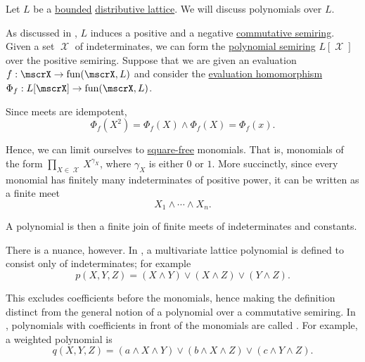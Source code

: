 \begin{remark}\label{rem:lattice_polynomials}
  Let \( L \) be a \hyperref[def:semilattice/bounded]{bounded} \hyperref[def:semilattice/distributive_lattice]{distributive lattice}. We will discuss polynomials over \( L \).

  As discussed in , \( L \) induces a positive and a negative \hyperref[def:semiring/commutative]{commutative semiring}. Given a set \( \mscrX \) of indeterminates, we can form the \hyperref[def:polynomial_algebra]{polynomial semiring} \( L[\mscrX] \) over the positive semiring. Suppose that we are given an evaluation \( f: \mscrX \to \fun(\mscrX, L) \) and consider the \hyperref[thm:polynomial_algebra_universal_property]{evaluation homomorphism} \( \Phi_f: L[\mscrX] \to \fun(\mscrX, L) \).

  Since meets are idempotent,
  \begin{equation*}
    \Phi_f(X^2) = \Phi_f(X) \wedge \Phi_f(X) = \Phi_f(x).
  \end{equation*}

  Hence, we can limit ourselves to \hyperref[def:square_free]{square-free} monomials. That is, monomials of the form \( \prod_{X \in \mscrX} X^{\gamma_X} \), where \( \gamma_X \) is either \( 0 \) or \( 1 \). More succinctly, since every monomial has finitely many indeterminates of positive power, it can be written as a finite meet
  \begin{equation*}
    X_1 \wedge \cdots \wedge X_n.
  \end{equation*}

  A polynomial is then a finite join of finite meets of indeterminates and constants.

  There is a nuance, however. In \cite[19]{Birkhoff1948}, a multivariate lattice polynomial is defined to consist only of indeterminates; for example
  \begin{equation*}
    p(X, Y, Z) = (X \wedge Y) \vee (X \wedge Z) \vee (Y \wedge Z).
  \end{equation*}

  This excludes coefficients before the monomials, hence making the definition distinct from the general notion of a polynomial over a commutative semiring. In \cite{Marichal2007}, polynomials with coefficients in front of the monomials are called . For example, a weighted polynomial is
  \begin{equation*}
    q(X, Y, Z) = (a \wedge X \wedge Y) \vee (b \wedge X \wedge Z) \vee (c \wedge Y \wedge Z).
  \end{equation*}


\end{remark}
